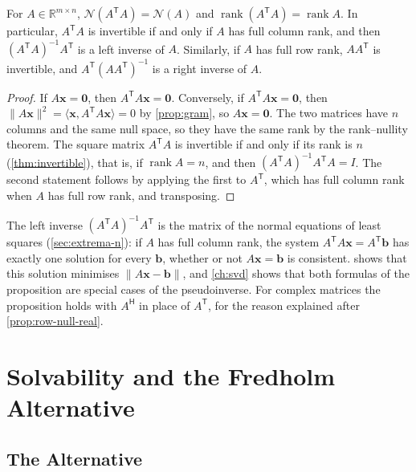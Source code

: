 \begin{proposition}
\label{prop:gram-rank}
For $A\in\mathbb R^{m\times n}$, $\mathcal N(A^{\mathsf T}A)=\mathcal N(A)$ and $\operatorname{rank}(A^{\mathsf T}A)=\operatorname{rank}A$. In particular, $A^{\mathsf T}A$ is invertible if and only if $A$ has full column rank, and then $(A^{\mathsf T}A)^{-1}A^{\mathsf T}$ is a left inverse of $A$. Similarly, if $A$ has full row rank, $AA^{\mathsf T}$ is invertible, and $A^{\mathsf T}(AA^{\mathsf T})^{-1}$ is a right inverse of $A$.
\end{proposition}

\begin{proof}
If $A\mathbf x=\mathbf 0$, then $A^{\mathsf T}A\mathbf x=\mathbf 0$. Conversely, if $A^{\mathsf T}A\mathbf x=\mathbf 0$, then $\|A\mathbf x\|^2=\langle\mathbf x,A^{\mathsf T}A\mathbf x\rangle=0$ by \cref{prop:gram}, so $A\mathbf x=\mathbf 0$. The two matrices have $n$ columns and the same null space, so they have the same rank by the rank--nullity theorem. The square matrix $A^{\mathsf T}A$ is invertible if and only if its rank is $n$ (\cref{thm:invertible}), that is, if $\operatorname{rank}A=n$, and then $(A^{\mathsf T}A)^{-1}A^{\mathsf T}A=I$. The second statement follows by applying the first to $A^{\mathsf T}$, which has full column rank when $A$ has full row rank, and transposing.
\end{proof}

The left inverse $(A^{\mathsf T}A)^{-1}A^{\mathsf T}$ is the matrix of the normal equations of least squares (\cref{sec:extrema-n}): if $A$ has full column rank, the system $A^{\mathsf T}A\mathbf x=A^{\mathsf T}\mathbf b$ has exactly one solution for every $\mathbf b$, whether or not $A\mathbf x=\mathbf b$ is consistent.  shows that this solution minimises $\|A\mathbf x-\mathbf b\|$, and \cref{ch:svd} shows that both formulas of the proposition are special cases of the pseudoinverse. For complex matrices the proposition holds with $A^{\mathsf H}$ in place of $A^{\mathsf T}$, for the reason explained after \cref{prop:row-null-real}.

\section{Solvability and the Fredholm Alternative}
\label{sec:fredholm}

\subsection{The Alternative}

